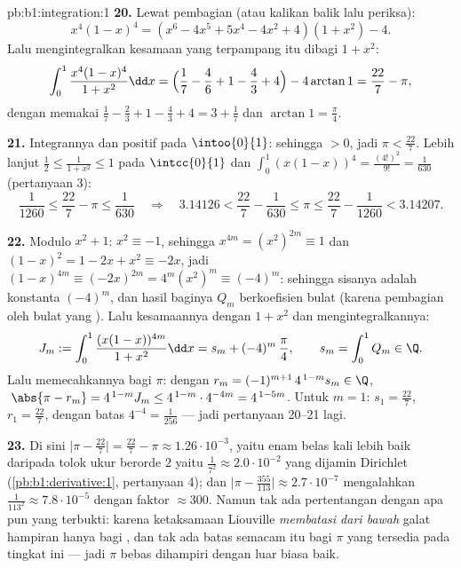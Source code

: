 \begin{solution}{pb:b1:integration:1}
\textbf{20.} Lewat pembagian  (atau kalikan balik lalu periksa):
\[
x^4(1-x)^4 = (x^6 - 4x^5 + 5x^4 - 4x^2 + 4)(1 + x^2) - 4 .
\]
Lalu mengintegralkan kesamaan yang terpampang itu dibagi $1 + x^2$:
\[
\int_0^1 \frac{x^4(1-x)^4}{1+x^2}\dd x
= \Bigl(\frac17 - \frac46 + 1 - \frac43 + 4\Bigr)
- 4\arctan 1
= \frac{22}{7} - \pi ,
\]
dengan memakai $\frac17 - \frac23 + 1 - \frac43 + 4 = 3 + \frac17$ dan
$\arctan 1 = \frac\pi4$.

\textbf{21.} Integrannya  dan positif pada
$\intoo{0}{1}$: sehingga  $> 0$, jadi $\pi < \frac{22}{7}$.
Lebih lanjut $\frac12 \leq \frac{1}{1+x^2} \leq 1$ pada
$\intcc{0}{1}$ dan $\int_0^1 (x(1-x))^4 = \frac{(4!)^2}{9!} =
\frac{1}{630}$ (pertanyaan 3):
\[
\frac{1}{1260} \leq \frac{22}{7} - \pi \leq \frac{1}{630}
\quad\Longrightarrow\quad
3.14126 < \frac{22}{7} - \frac{1}{630} \leq \pi \leq
\frac{22}{7} - \frac{1}{1260} < 3.14207 .
\]

\textbf{22.} Modulo $x^2 + 1$: $x^2 \equiv -1$, sehingga $x^{4m} =
(x^2)^{2m} \equiv 1$ dan $(1 - x)^2 = 1 - 2x + x^2 \equiv -2x$,
jadi $(1-x)^{4m} \equiv (-2x)^{2m} = 4^m (x^2)^m \equiv
(-4)^m$: sehingga sisanya adalah konstanta $(-4)^m$, dan
hasil baginya $Q_m$ berkoefisien bulat (karena pembagian oleh 
bulat yang ). Lalu  kesamaannya dengan $1 + x^2$ dan
mengintegralkannya:
\[
J_m := \int_0^1 \frac{(x(1-x))^{4m}}{1+x^2}\dd x
= s_m + (-4)^m\,\frac{\pi}{4},
\qquad s_m = \int_0^1 Q_m \in \Q .
\]
Lalu memecahkannya bagi $\pi$: dengan $r_m = (-1)^{m+1}\,4^{\,1-m} s_m \in
\Q$, $\;\abs{\pi - r_m} = 4^{\,1-m} J_m \leq
4^{\,1-m}\cdot4^{-4m} = 4^{\,1-5m}$. Untuk $m = 1$: $s_1 =
\frac{22}{7}$, $r_1 = \frac{22}{7}$, dengan batas $4^{-4} =
\frac{1}{256}$ --- jadi pertanyaan 20--21 lagi.

\textbf{23.} Di sini $\bigl|\pi - \frac{22}{7}\bigr| = \frac{22}{7} -
\pi \approx 1.26\cdot10^{-3}$, yaitu enam belas kali lebih baik daripada
tolok ukur berorde $2$ yaitu $\frac{1}{7^2} \approx 2.0\cdot10^{-2}$
yang dijamin Dirichlet (\cref{pb:b1:derivative:1}, pertanyaan 4);
dan $\bigl|\pi - \frac{355}{113}\bigr| \approx 2.7\cdot10^{-7}$
mengalahkan $\frac{1}{113^2} \approx 7.8\cdot10^{-5}$ dengan faktor
$\approx 300$. Namun tak ada pertentangan dengan apa pun yang terbukti: karena ketaksamaan
Liouville \emph{membatasi dari bawah} galat hampiran hanya bagi
, dan tak ada batas semacam itu bagi $\pi$ yang tersedia pada
tingkat ini --- jadi $\pi$ bebas dihampiri dengan luar biasa
baik.


\end{solution}
